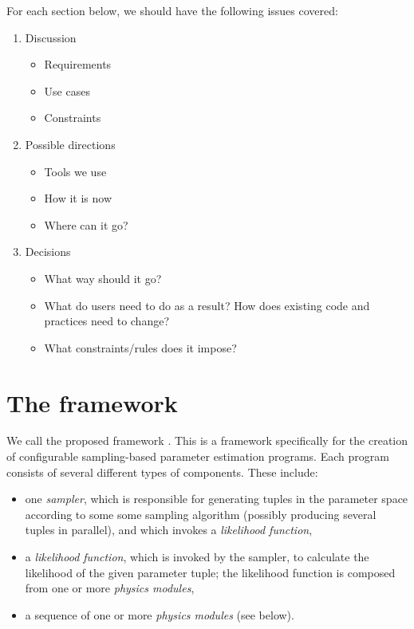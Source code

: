 \documentclass[draftmode,draftwater]{memarticle}
\newcommand{\cosmosis}{\name{CosmoSIS}\xspace}
\begin{document}
\begin{fixme}
  For each section below, we should have the following issues covered:

  \begin{enumerate}
  \item Discussion
    \begin{itemize}
    \item Requirements
    \item Use cases
    \item Constraints
    \end{itemize}
  \item Possible directions
    \begin{itemize}
    \item Tools we use
    \item How it is now
    \item Where can it go?
    \end{itemize}
  \item Decisions
    \begin{itemize}
    \item What way should it go?
    \item What do users need to do as a result? How does existing code
      and practices need to change?
    \item What constraints/rules does it impose?
    \end{itemize}
  \end{enumerate}
\end{fixme}

\section{The \cosmosis framework}

We call the proposed framework \cosmosis. This is a framework
specifically for the creation of configurable sampling-based parameter
estimation programs. Each program consists of several different types of
components. These include:
\begin{itemize}
\item one \emph{sampler}, which is responsible for generating tuples in
  the parameter space according to some some sampling algorithm
  (possibly producing several tuples in parallel), and which invokes a
  \emph{likelihood function},
\item a \emph{likelihood function}, which is invoked by the sampler, to
  calculate the likelihood of the given parameter tuple; the likelihood
  function is composed from one or more \emph{physics modules},
\item a sequence of one or more \emph{physics modules} (see below).
\end{itemize}
\end{document}
